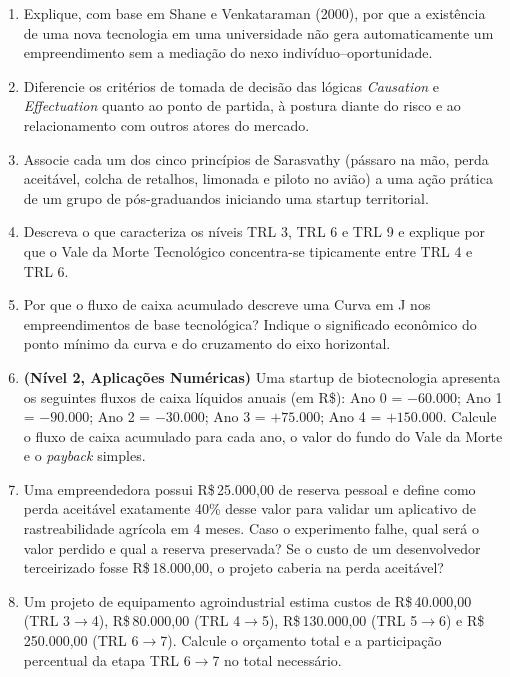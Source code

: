 \begin{enumerate}[leftmargin=1.5em, itemsep=6pt]
  \item Explique, com base em Shane e Venkataraman (2000), por que a existência de uma nova tecnologia em uma universidade não gera automaticamente um empreendimento sem a mediação do nexo indivíduo–oportunidade.
  \espacoResolucao[1.8cm]

  \item Diferencie os critérios de tomada de decisão das lógicas \textit{Causation} e \textit{Effectuation} quanto ao ponto de partida, à postura diante do risco e ao relacionamento com outros atores do mercado.
  \espacoResolucao[1.8cm]

  \item Associe cada um dos cinco princípios de Sarasvathy (pássaro na mão, perda aceitável, colcha de retalhos, limonada e piloto no avião) a uma ação prática de um grupo de pós-graduandos iniciando uma startup territorial.
  \espacoResolucao[2.0cm]

  \item Descreva o que caracteriza os níveis TRL 3, TRL 6 e TRL 9 e explique por que o Vale da Morte Tecnológico concentra-se tipicamente entre TRL 4 e TRL 6.
  \espacoResolucao[1.8cm]

  \item Por que o fluxo de caixa acumulado descreve uma Curva em J nos empreendimentos de base tecnológica? Indique o significado econômico do ponto mínimo da curva e do cruzamento do eixo horizontal.
  \espacoResolucao[1.8cm]

  \item \textbf{(Nível 2, Aplicações Numéricas)} Uma startup de biotecnologia apresenta os seguintes fluxos de caixa líquidos anuais (em R\$): Ano 0 = $-60.000$; Ano 1 = $-90.000$; Ano 2 = $-30.000$; Ano 3 = $+75.000$; Ano 4 = $+150.000$. Calcule o fluxo de caixa acumulado para cada ano, o valor do fundo do Vale da Morte e o \textit{payback} simples.
  \espacoResolucao[2.4cm]

  \item Uma empreendedora possui R\$\,25.000,00 de reserva pessoal e define como perda aceitável exatamente 40\% desse valor para validar um aplicativo de rastreabilidade agrícola em 4 meses. Caso o experimento falhe, qual será o valor perdido e qual a reserva preservada? Se o custo de um desenvolvedor terceirizado fosse R\$\,18.000,00, o projeto caberia na perda aceitável?
  \espacoResolucao[2.2cm]

  \item Um projeto de equipamento agroindustrial estima custos de R\$\,40.000,00 (TRL 3$\to$4), R\$\,80.000,00 (TRL 4$\to$5), R\$\,130.000,00 (TRL 5$\to$6) e R\$\,250.000,00 (TRL 6$\to$7). Calcule o orçamento total e a participação percentual da etapa TRL 6$\to$7 no total necessário.
  \espacoResolucao[2.2cm]


\end{enumerate}
